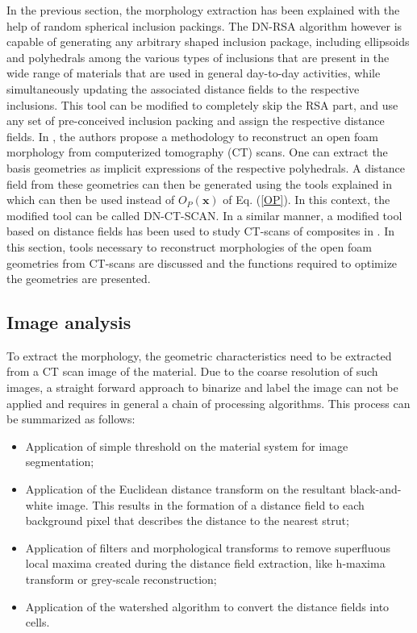 In the previous section, the morphology extraction has been explained with the help of random spherical inclusion packings. The DN-RSA algorithm however is capable of generating any arbitrary shaped inclusion package, including ellipsoids and polyhedrals among the various types of inclusions that are present in the wide range of materials that are used in general day-to-day activities, while simultaneously updating the associated distance fields to the respective inclusions. This tool can be modified to completely skip the RSA part, and use any set of pre-conceived inclusion packing and assign the respective distance fields. In \cite{leblancAnalysisOpenFoamUnderPreparation}, the authors propose a methodology to reconstruct an open foam morphology from computerized tomography (CT) scans. One can extract the basis geometries as implicit expressions of the respective polyhedrals. A distance field from these geometries can then be generated using the tools explained in \cite{ehabmoustafakamelIntegratedApproachConformal2019} which can then be used instead of $ O_P(\textbf{x}) $ of Eq. (\ref{OP}). In this context, the modified tool can be called DN-CT-SCAN. In a similar manner, a modified tool based on distance fields has been used to study CT-scans of composites in \cite{wintibaAutomatedReconstructionConformal2020}. In this section, tools necessary to reconstruct morphologies of the open foam geometries from CT-scans are discussed and the functions required to optimize the geometries are presented.

\subsection{Image analysis}\label{of-CT-image}
To extract the morphology, the geometric characteristics need to be extracted from a CT scan image of the material. Due to the coarse resolution of such images, a straight forward approach to binarize and label the image can not be applied and requires in general a chain of processing algorithms\cite{lautensackFittingThreedimensionalLaguerre2008}. This process can be summarized as follows:
\begin{itemize}
	\item Application of simple threshold on the material system for image segmentation;
	\item Application of the Euclidean distance transform on the resultant black-and-white image. This results in the formation of a distance field to each background pixel that describes the distance to the nearest strut;
	\item Application of filters and morphological transforms to remove superfluous local maxima created during the distance field extraction, like h-maxima transform\cite{jierongchengSegmentationClusteredNuclei2009,schladitzGeometricCharacterisationLight2006} or grey-scale reconstruction\cite{vincentMorphologicalGrayscaleReconstruction1993};
	\item Application of the watershed algorithm\cite{vincentWatershedsDigitalSpaces1991} to convert the distance fields into cells.
\end{itemize}

